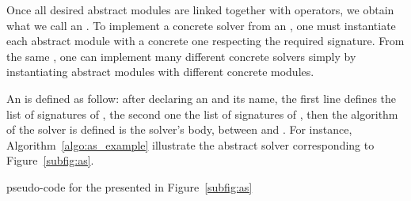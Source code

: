 Once all desired abstract modules are linked together with operators, we obtain what we call an \as. To implement a concrete solver from an \as, one must instantiate each abstract module with a concrete one respecting the required signature. From the same \as, one can implement many different concrete solvers simply by instantiating abstract modules with different concrete modules.

An \as{} is defined as follow: after declaring an \mbox{} and its name, the first line defines the list of signatures of \oms, the second one the list of signatures of \opchs, then the algorithm of the solver is defined is the solver's body, between \mbox{} and \mbox{}. For instance, Algorithm~\ref{algo:as_example} illustrate the abstract solver corresponding to Figure~\ref{subfig:as}.


\begin{algorithm}[H]
\dontprintsemicolon
\SetNoline
{}
\caption{\posl{} pseudo-code for the \as{} presented in Figure~\ref{subfig:as}}\label{algo:as_example}
\end{algorithm}	